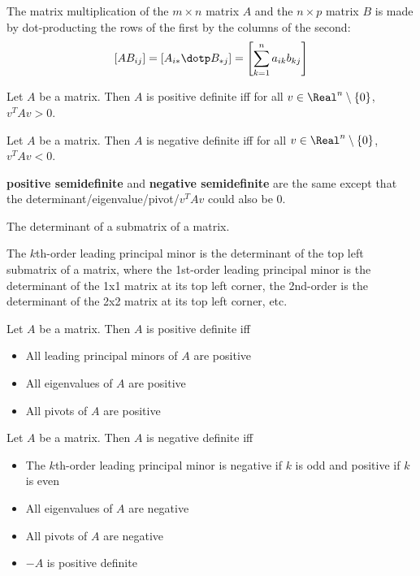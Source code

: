 \begin{definition}
  The matrix multiplication of  the $m \times n$ matrix $A$ and the $n \times p$ matrix $B$ is made by dot-producting the rows of the first by the columns of the second:
  \[
    \left[AB_{ij}\right] = \left[A_{i*} \dotp B_{*j}\right] = \left[\sum_{k=1}^n a_{ik} b_{kj} \right]
  \]
\end{definition}

\begin{definition}
  Let $A$ be a matrix. Then $A$ is positive definite iff for all $v \in \Real^n \setminus \{0\}$, $v^T A v > 0$.
\end{definition}

\begin{definition}
  Let $A$ be a matrix. Then $A$ is negative definite iff for all $v \in \Real^n \setminus \{0\}$, $v^T A v < 0$.
\end{definition}

\textbf{positive semidefinite} and \textbf{negative semidefinite} are the same except that the determinant/eigenvalue/pivot/$v^T A v$ could also be 0.

\begin{definition}
  The determinant of a submatrix of a matrix.
\end{definition}

\begin{definition}
  The $k$th-order leading principal minor is the determinant of the top left submatrix of a matrix, where the 1st-order leading principal minor is the determinant of the 1x1 matrix at its top left corner, the 2nd-order is the determinant of the 2x2 matrix at its top left corner, etc.
\end{definition}

\begin{theorem}
  Let $A$ be a matrix. Then $A$ is positive definite iff
  \begin{itemize}
    \item All leading principal minors of $A$ are positive
    \item All eigenvalues of $A$ are positive
    \item All pivots of $A$ are positive
  \end{itemize}
\end{theorem}

\begin{theorem}
  Let $A$ be a matrix. Then $A$ is negative definite iff
  \begin{itemize}
    \item The $k$th-order leading principal minor is negative if $k$ is odd and positive if $k$ is even
    \item All eigenvalues of $A$ are negative
    \item All pivots of $A$ are negative
    \item $-A$ is positive definite
  \end{itemize}
\end{theorem}

